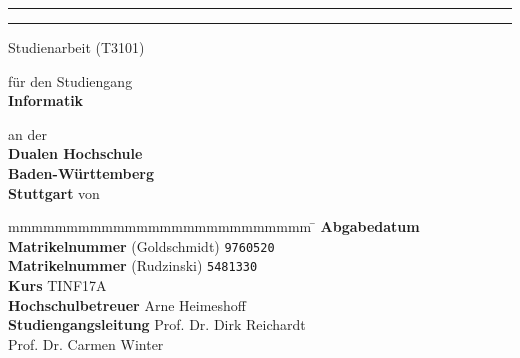 \hfill
{}

\vfill\vfill

\begin{center}
	\rule{\linewidth}{1pt}
	{
		\Huge \bfseries
			\@title
		\par	
	}
	\vspace{-0.2cm}
	\rule{\linewidth}{1pt}
	

	Studienarbeit (T3101)
	\vfill
	
	für den Studiengang \\ \textbf{Informatik}
	
	an der \\ \textbf{Dualen Hochschule \\Baden-Württemberg\\Stuttgart}
	\vfill
	von \\ \textbf{\textsc{\@author}}
\end{center}

\vfill\vfill

\begin{tabbing}
	mmmmmmmmmmmmmmmmmmmmmmmmmm				\= \kill
	\textbf{Abgabedatum} \> \@date \\
	\textbf{Matrikelnummer} (Goldschmidt) \> \texttt{9760520} \\
	\textbf{Matrikelnummer} (Rudzinski) \> \texttt{5481330} \\
	\textbf{Kurs}	\> TINF17A \\
	\textbf{Hochschulbetreuer} \> Arne Heimeshoff \\ 
	\textbf{Studiengangsleitung} \> Prof. Dr. Dirk Reichardt \\
	\> Prof. Dr. Carmen Winter
\end{tabbing}